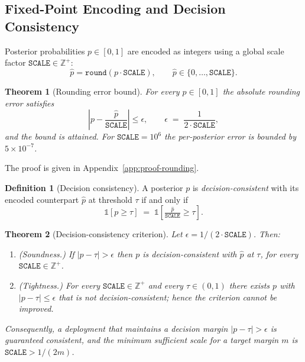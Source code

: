\documentclass[journal]{IEEEtran}
\newtheorem{theorem}{Theorem}
\theoremstyle{definition}
\newtheorem{definition}{Definition}
\theoremstyle{remark}
\begin{document}
\subsection{Fixed-Point Encoding and Decision
Consistency}

Posterior probabilities $p\in[0,1]$ are encoded as
integers using a global scale factor
$\texttt{SCALE}\in\mathbb{Z}^+$:
\[
  \widehat{p}
  = \texttt{round}(p\cdot\texttt{SCALE}),
  \qquad
  \widehat{p}\in\{0,\dots,\texttt{SCALE}\}.
\]

\begin{theorem}[Rounding error bound]
\label{thm:rounding}
For every $p\in[0,1]$ the absolute rounding error satisfies
\[
  \left|p - \frac{\widehat{p}}{\texttt{SCALE}}\right|
  \leq \epsilon,
  \qquad
  \epsilon \;=\; \frac{1}{2\cdot\texttt{SCALE}},
\]
and the bound is attained. For $\texttt{SCALE}=10^6$ the
per-posterior error is bounded by $5\times10^{-7}$.
\end{theorem}

\noindent The proof is given in
Appendix~\ref{app:proof-rounding}.

\begin{definition}[Decision consistency]
\label{def:dec-consistency}
A posterior $p$ is \emph{decision-consistent} with its
encoded counterpart $\widehat{p}$ at threshold $\tau$
if and only if
\[
  \mathbb{1}[p \geq \tau]
  \;=\;
  \mathbb{1}\!\left[
    \tfrac{\widehat{p}}{\texttt{SCALE}} \geq \tau
  \right].
\]
\end{definition}

\begin{theorem}[Decision-consistency criterion]
\label{thm:dec-consistency}
Let $\epsilon = 1/(2\cdot\texttt{SCALE})$. Then:
\begin{enumerate}
  \item \emph{(Soundness.)} If $|p-\tau| > \epsilon$ then
  $p$ is decision-consistent with $\widehat{p}$ at $\tau$,
  for every $\texttt{SCALE}\in\mathbb{Z}^+$.
  \item \emph{(Tightness.)} For every
  $\texttt{SCALE}\in\mathbb{Z}^+$ and every
  $\tau\in(0,1)$ there exists $p$ with
  $|p-\tau|\leq\epsilon$ that is \emph{not}
  decision-consistent; hence the criterion cannot be
  improved.
\end{enumerate}
Consequently, a deployment that maintains a decision margin
$|p-\tau|>\epsilon$ is guaranteed consistent, and the
minimum sufficient scale for a target margin $m$ is
$\texttt{SCALE} > 1/(2m)$.
\end{theorem}
\end{document}
